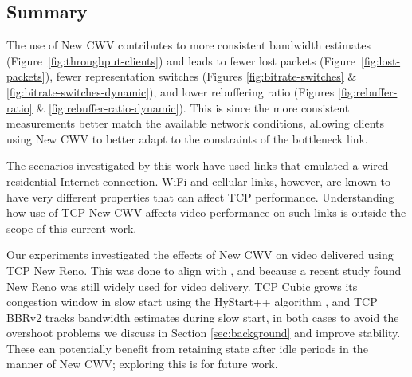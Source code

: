 \documentclass[10pt,sigconf]{acmart}
\begin{document}
\subsection{Summary}
\label{sec:summary}


The use of New CWV contributes to more consistent bandwidth estimates (Figure~\ref{fig:throughput-clients}) and leads to fewer lost packets (Figure~\ref{fig:lost-packets}), fewer representation switches (Figures \ref{fig:bitrate-switches} \& \ref{fig:bitrate-switches-dynamic}), and lower rebuffering ratio (Figures \ref{fig:rebuffer-ratio} \& \ref{fig:rebuffer-ratio-dynamic}).
This is since the more consistent measurements better match the available network conditions, allowing clients using New CWV to better adapt to the constraints of the bottleneck link. 

The scenarios investigated by this work have used links that emulated a wired
residential Internet connection.  WiFi and cellular links, however, are known
to have very different properties that can affect TCP performance. Understanding
how use of TCP New CWV affects video performance on such links is outside the
scope of this current work.

Our experiments investigated the effects of New CWV on video delivered
using TCP New Reno. This was done to align with
\cite{Nazir-2014-performance-evaluation-congestion-window-validation-dash-newcwv},
and because a recent study \cite{Mishra-2019-the-great-internet-tcp-congestion-control-census}
found New Reno was still widely used for video delivery.
%
TCP Cubic grows its congestion window in slow start using the HyStart++
algorithm \cite{draft-ietf-tcpm-hystartplusplus}, and TCP BBRv2 tracks
bandwidth estimates during slow start, in both cases to avoid the overshoot
problems we discuss in Section \ref{sec:background} and improve stability.
These can potentially benefit from retaining state after idle periods in
the manner of New CWV; exploring this is for future work.
\end{document}
